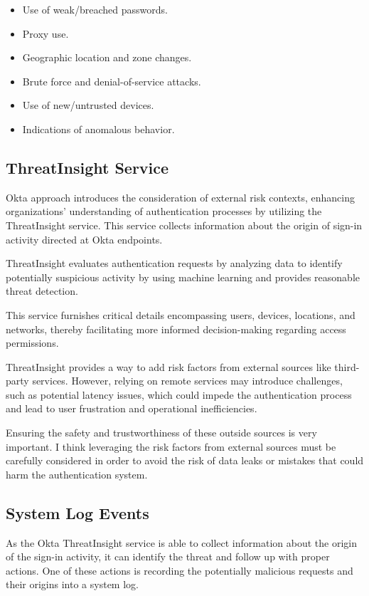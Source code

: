 \begin{itemize}
    \item Use of weak/breached passwords.
    \item Proxy use.
    \item Geographic location and zone changes.
    \item Brute force and denial-of-service attacks.
    \item Use of new/untrusted devices.
    \item Indications of anomalous behavior. 
\end{itemize}

\newpage
\subsection*{ThreatInsight Service}
Okta approach introduces the consideration of external risk contexts, enhancing organizations' understanding of authentication processes by utilizing the ThreatInsight service.
This service collects information about the origin of sign-in activity directed at Okta endpoints.

ThreatInsight evaluates authentication requests by analyzing data to identify potentially suspicious activity by using machine learning and provides reasonable threat detection. 

This service furnishes critical details encompassing users, devices, locations, and networks, thereby facilitating more informed decision-making regarding access permissions.

ThreatInsight provides a way to add risk factors from external sources like third-party services. However, relying on remote services may introduce challenges, such as potential latency issues, which could impede the authentication process and lead to user frustration and operational inefficiencies.\cite{existing-okta-lowrisk} \cite{existing-okta-confidence}

Ensuring the safety and trustworthiness of these outside sources is very important.
I think leveraging the risk factors from external sources must be carefully considered in order to avoid the risk of data leaks or mistakes that could harm the authentication system.

\subsection*{System Log Events}
As the Okta ThreatInsight service is able to collect information about the origin of the sign-in activity, it can identify the threat and follow up with proper actions.
One of these actions is recording the potentially malicious requests and their origins into a system log.

